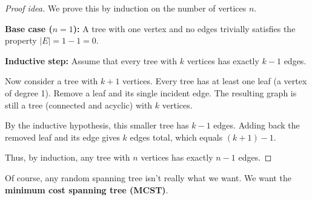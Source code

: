 \begin{proof}[Proof idea]
We prove this by induction on the number of vertices \( n \).

\textbf{Base case (\( n = 1 \)):}  
A tree with one vertex and no edges trivially satisfies the property \( |E| = 1 - 1 = 0 \).

\begin{center}
\end{center}

\textbf{Inductive step:}  
Assume that every tree with \( k \) vertices has exactly \( k - 1 \) edges.

Now consider a tree with \( k + 1 \) vertices. Every tree has at least one leaf (a vertex of degree 1). Remove a leaf and its single incident edge. The resulting graph is still a tree (connected and acyclic) with \( k \) vertices.

By the inductive hypothesis, this smaller tree has \( k - 1 \) edges. Adding back the removed leaf and its edge gives \( k \) edges total, which equals \( (k + 1) - 1 \).

\begin{center}
\vspace{1cm}
\end{center}

Thus, by induction, any tree with \( n \) vertices has exactly \( n - 1 \) edges.
\end{proof}





Of course, any random spanning tree isn't really what we want.  We want the \textbf{minimum cost spanning tree (MCST)}.




